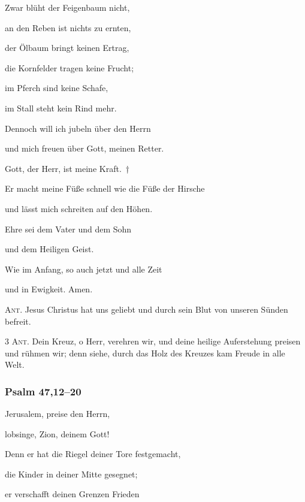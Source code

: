 \noindent Zwar blüht der Feigenbaum nicht,~\GreStar{}~\nopagebreak

an den Reben ist nichts zu ernten, 

\noindent der Ölbaum bringt keinen Ertrag,~\GreStar{}~\nopagebreak

die Kornfelder tragen keine Frucht; 

\noindent im Pferch sind keine Schafe,~\GreStar{}~\nopagebreak

im Stall steht kein Rind mehr.

\noindent Dennoch will ich jubeln über den Herrn~\GreStar{}~\nopagebreak

und mich freuen über Gott, meinen Retter.

\noindent Gott, der Herr, ist meine Kraft.~†~\nopagebreak

Er macht meine Füße schnell wie die Füße der Hirsche~\GreStar{}~\nopagebreak

und lässt mich schreiten auf den Höhen.

\noindent Ehre sei dem Vater und dem Sohn~\GreStar{}~\nopagebreak

und dem Heiligen Geist.

\noindent Wie im Anfang, so auch jetzt und alle Zeit~\GreStar{}~\nopagebreak

und in Ewigkeit. Amen.

\vspace{10pt}

\noindent \textsc{Ant.} Jesus Christus hat uns geliebt und durch sein Blut von unseren Sünden befreit.

\vspace{10pt}

\noindent \textsc{3 Ant.} Dein Kreuz, o Herr, verehren wir, und deine heilige Auferstehung preisen und rühmen wir; denn siehe, durch das Holz des Kreuzes kam Freude in alle Welt.

\subsubsection{Psalm 47,12--20}

\noindent Jerusalem, preise den Herrn,~\GreStar{}~\nopagebreak

lobsinge, Zion, deinem Gott!

\noindent Denn er hat die Riegel deiner Tore festgemacht,~\GreStar{}~\nopagebreak

die Kinder in deiner Mitte gesegnet;

\noindent er verschafft deinen Grenzen Frieden~\GreStar{}~\nopagebreak

